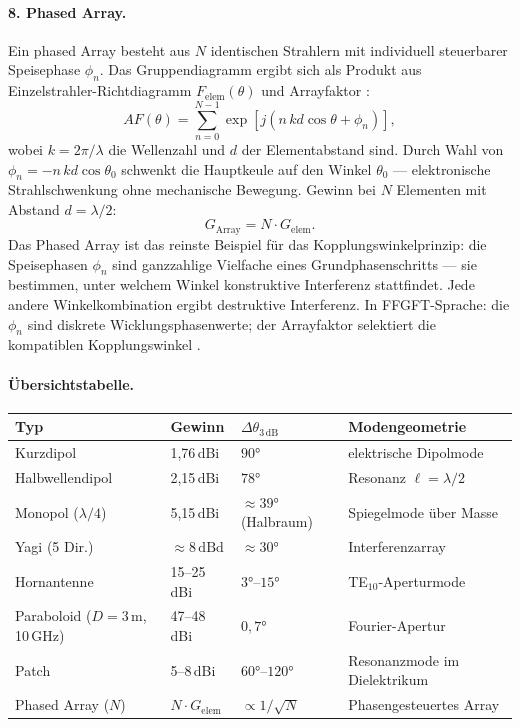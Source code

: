 \paragraph{8. Phased Array.}

Ein phased Array besteht aus $N$ identischen Strahlern mit individuell
steuerbarer Speisephase $\phi_n$. Das Gruppendiagramm ergibt sich als
Produkt aus Einzelstrahler-Richtdiagramm $F_\mathrm{elem}(\theta)$ und
Arrayfaktor \cite{Mailloux2017,Balanis2016}:
\[
  AF(\theta) = \sum_{n=0}^{N-1} \exp\!\left[j\left(n\,kd\cos\theta + \phi_n\right)\right],
\]
wobei $k = 2\pi/\lambda$ die Wellenzahl und $d$ der Elementabstand sind.
Durch Wahl von $\phi_n = -n\,kd\cos\theta_0$ schwenkt die Hauptkeule auf
den Winkel $\theta_0$ --- elektronische Strahlschwenkung ohne mechanische
Bewegung. Gewinn bei $N$ Elementen mit Abstand $d = \lambda/2$:
\[
  G_\mathrm{Array} = N \cdot G_\mathrm{elem}.
\]
Das Phased Array ist das reinste Beispiel für das Kopplungswinkelprinzip:
die Speisephasen $\phi_n$ sind ganzzahlige Vielfache eines Grundphasenschritts
--- sie bestimmen, unter welchem Winkel konstruktive Interferenz stattfindet.
Jede andere Winkelkombination ergibt destruktive Interferenz. In FFGFT-Sprache:
die $\phi_n$ sind diskrete Wicklungsphasenwerte; der Arrayfaktor selektiert
die kompatiblen Kopplungswinkel \SM.

\paragraph{Übersichtstabelle.}

\begin{center}
\begin{tabular}{@{}llll@{}}
\toprule
\textbf{Typ} & \textbf{Gewinn} & \textbf{$\Delta\theta_{3\,\mathrm{dB}}$}
             & \textbf{Modengeometrie} \\
\midrule
Kurzdipol     & 1,76\,dBi  & $90°$         & elektrische Dipolmode \\
Halbwellendipol & 2,15\,dBi & $78°$       & Resonanz $\ell=\lambda/2$ \\
Monopol ($\lambda/4$) & 5,15\,dBi & ${\approx}39°$ (Halbraum) & Spiegelmode über Masse \\
Yagi (5 Dir.) & ${\approx}8\,\mathrm{dBd}$ & ${\approx}30°$ & Interferenzarray \\
Hornantenne   & 15--25\,dBi & $3°$--$15°$ & TE$_{10}$-Aperturmode \\
Paraboloid ($D=3\,\mathrm{m}$, 10\,GHz) & 47--48\,dBi & $0{,}7°$ & Fourier-Apertur \\
Patch         & 5--8\,dBi  & $60°$--$120°$ & Resonanzmode im Dielektrikum \\
Phased Array ($N$) & $N \cdot G_\mathrm{elem}$ & $\propto 1/\sqrt{N}$ & Phasengesteuertes Array \\
\bottomrule
\end{tabular}
\end{center}

